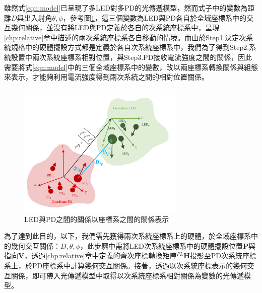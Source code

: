         \hfill
    
        雖然式\ref{eqn:model}已呈現了多LED對多PD的光傳遞模型，然而式子中的變數為距離$D$與出入射角$\theta,\phi$，參考圖\ref{pic:relative_vs_coor}，這三個變數為LED與PD各自於全域座標系中的交互幾何關係，並沒有將LED與PD定義於各自的次系統座標系中，呈現\ref{chp:relative}章中描述的兩次系統座標系各自移動的情境。而由於Step1.決定次系統規格中的硬體擺設方式都是定義於各自次系統座標系中，我們為了得到Step2.系統設置中兩次系統座標系相對位置，與Step3.PD接收電流強度之間的關係，因此需要將式\ref{eqn:model}中的三個全域座標系中的變數，改以兩座標系轉換關係與組態來表示，才能夠利用電流強度得到兩次系統之間的相對位置關係。
    
        \begin{figure}[htpb]
            \centering
            \includegraphics[width=8cm]{ch2pic/relative_vs_coor.png}
            \caption{LED與PD之間的關係以座標系之間的關係表示}
            \label{pic:relative_vs_coor}
        \end{figure}
    
        為了達到此目的，以下，我們需先獲得兩次系統座標系上的硬體，於全域座標系中的幾何交互關係：$D,\theta,\phi$，此步驟中需將LED次系統座標系中的硬體擺設位置$\boldsymbol{P}$與指向$\boldsymbol{V}$，透過\ref{chp:relative}章中定義的齊次座標轉換矩陣$^{PL}\boldsymbol{H}$投影至PD次系統座標系上，於PD座標系中計算幾何交互關係。接著，透過以次系統座標表示的幾何交互關係，即可帶入光傳遞模型中取得以次系統座標系相對關係為變數的光傳遞模型。
        
        
 
        
    
            
